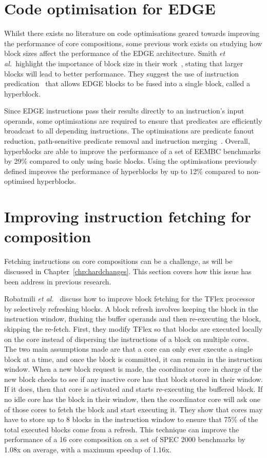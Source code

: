 \section{Code optimisation for EDGE}

Whilst there exists no literature on code optimisations geared towards improving the performance of core compositions, some previous work exists on studying how block sizes affect the performance of the EDGE architecture.
Smith {\it et al.~}highlight the importance of block size in their work~\cite{smith2006edge}, stating that larger blocks will lead to better performance.
They suggest the use of instruction predication~\cite{smith2006dataflowpred} that allows EDGE blocks to be fused into a single block, called a hyperblock.

Since EDGE instructions pass their results directly to an instruction's input operands, some optimisations are required to ensure that predicates are efficiently broadcast to all depending instructions.
The optimisations are predicate fanout reduction, path-sensitive predicate removal and instruction merging~\cite{smith2006dataflowpred}.
Overall, hyperblocks are able to improve the performance of a set of EEMBC benchmarks by 29\% compared to only using basic blocks.
Using the optimisations previously defined improves the performance of hyperblocks by up to 12\% compared to non-optimised hyperblocks.
\vspace{-1em}
\section{Improving instruction fetching for composition}
Fetching instructions on core compositions can be a challenge, as will be discussed in Chapter~\ref{chp:hardchanges}.
This section covers how this issue has been address in previous research.

Robatmili {\it et al.~}\cite{robatmili2011uniproc} discuss how to improve block fetching for the TFlex processor by selectively refreshing blocks.
A block refresh involves keeping the block in the instruction window, flushing the buffer operands and then re-executing the block, skipping the re-fetch.
First, they modify TFlex so that blocks are executed locally on the core instead of dispersing the instructions of a block on multiple cores.
The two main assumptions made are that a core can only ever execute a single block at a time, and once the block is committed, it can remain in the instruction window.
When a new block request is made, the coordinator core in charge of the new block checks to see if any inactive core has that block stored in their window.
If it does, then that core is activated and starts re-executing the buffered block.
If no idle core has the block in their window, then the coordinator core will ask one of those cores to fetch the block and start executing it.
They show that cores may have to store up to 8 blocks in the instruction window to ensure that 75\% of the total executed blocks come from a refresh.
This technique can improve the performance of a 16 core composition on a set of SPEC 2000 benchmarks by 1.08x on average, with a maximum speedup of 1.16x.


